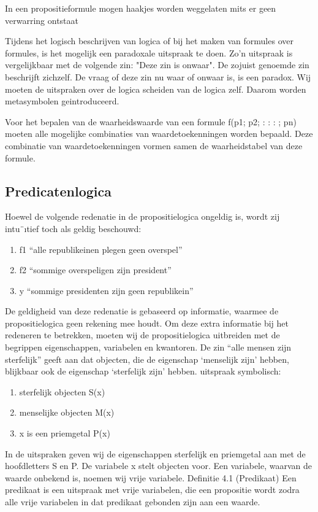 \documentclass{article}
\begin{document}
	In een propositieformule mogen haakjes worden weggelaten mits er geen verwarring ontstaat
	
	Tijdens het logisch beschrijven van logica of bij het maken van formules over formules, is
	het mogelijk  een paradoxale uitspraak te doen. Zo’n uitspraak is vergelijkbaar met
	de volgende zin: "Deze zin is onwaar".
	De zojuist genoemde zin beschrijft zichzelf. De vraag of deze zin nu waar of onwaar is, is een paradox.
	Wij moeten de uitspraken over de logica scheiden van de logica zelf. Daarom worden
	metasymbolen geintroduceerd.  
	
	Voor het bepalen van de waarheidswaarde van een formule f(p1; p2; : : : ; pn) moeten alle
	mogelijke combinaties van waardetoekenningen worden bepaald. Deze combinatie van
	waardetoekenningen vormen samen de waarheidstabel van deze formule.
	
	
	\subsection{Predicatenlogica}
	
	Hoewel de volgende redenatie in de propositielogica ongeldig is, wordt zij intu¨ıtief toch
	als geldig beschouwd:
	\begin{enumerate}
		\item f1 “alle republikeinen plegen geen overspel”
		\item f2 “sommige overspeligen zijn president”
		\item y “sommige presidenten zijn geen republikein”
	\end{enumerate}
	De geldigheid van deze redenatie is gebaseerd op informatie, waarmee de propositielogica
	geen rekening mee houdt. Om deze extra informatie bij het redeneren te betrekken,
	moeten wij de propositielogica uitbreiden met de begrippen eigenschappen, variabelen en
	kwantoren. De zin “alle mensen zijn sterfelijk” geeft aan dat objecten, die de eigenschap
	‘menselijk zijn’ hebben, blijkbaar ook de eigenschap ‘sterfelijk zijn’ hebben.
	uitspraak symbolisch:
	
	\begin{enumerate}
		\item sterfelijk objecten S(x)
		\item menselijke objecten M(x)
		\item x is een priemgetal P(x)
	\end{enumerate}
	
	
	In de uitspraken geven wij de eigenschappen sterfelijk en priemgetal aan met de hoofdletters
	S en P. De variabele x stelt objecten voor. Een variabele, waarvan de waarde onbekend
	is, noemen wij vrije variabele.
	Definitie 4.1 (Predikaat) Een predikaat is een uitspraak met vrije variabelen, die een
	propositie wordt zodra alle vrije variabelen in dat predikaat gebonden zijn aan een waarde.
	
\end{document}
